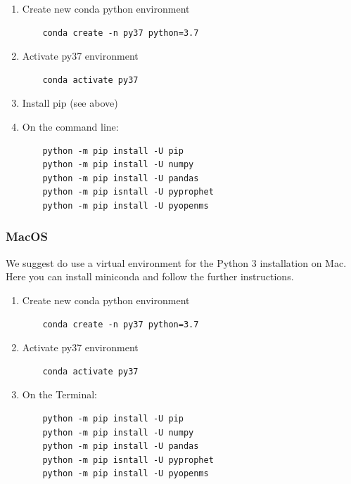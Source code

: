 \begin{enumerate}
  \item Create new conda python environment
    \begin{lstlisting}
    conda create -n py37 python=3.7
    \end{lstlisting} 
    \item Activate py37 environment
    \begin{lstlisting}
    conda activate py37
    \end{lstlisting} 
  \item Install pip (see above)
  \item On the command line:
    \begin{lstlisting}
    python -m pip install -U pip
    python -m pip install -U numpy
    python -m pip install -U pandas
    python -m pip isntall -U pyprophet
    python -m pip install -U pyopenms
    \end{lstlisting}
\end{enumerate}

\subsubsection{MacOS}
We suggest do use a virtual environment for the Python 3 installation on Mac. 
Here you can install miniconda and follow the further instructions. \\

\begin{enumerate}
  \item Create new conda python environment
    \begin{lstlisting}
    conda create -n py37 python=3.7
    \end{lstlisting} 
    \item Activate py37 environment
    \begin{lstlisting}
    conda activate py37
    \end{lstlisting} 
  \item On the Terminal:
    \begin{lstlisting}
    python -m pip install -U pip
    python -m pip install -U numpy
    python -m pip install -U pandas
    python -m pip isntall -U pyprophet
    python -m pip install -U pyopenms
    \end{lstlisting}
\end{enumerate}

